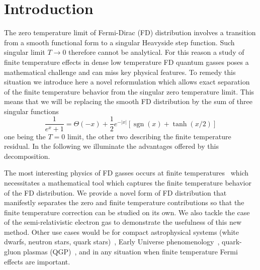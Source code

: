 \documentclass[sn-mathphys,Numbered]{sn-jnl}
\DeclareMathOperator{\sgn}{sgn}
\begin{document}

\maketitle

\section{Introduction}
\label{sec1}



The  zero temperature limit of Fermi-Dirac (FD) distribution involves a transition from a smooth functional form to a singular Heavyside step function. Such singular limit  $
T\to 0$ therefore cannot be analytical.  For this reason a study of finite temperature effects in dense  low temperature  FD quantum gasses poses a mathematical challenge and can miss key physical features.  To remedy this situation we introduce here a novel reformulation which allows exact separation of the finite temperature behavior from the singular zero temperature limit. This means that we will be replacing the smooth FD distribution by the sum of three singular functions
$$
\boxed{\frac{1}{e^{x} +1}=\Theta(-x)+\frac{1}{2}e^{-|x|}\left[\sgn(x)+\tanh(x/2)\right]}
$$
one being the $T=0$ limit,  the other two describing the finite temperature residual. In the following we illuminate the advantages offered by this decomposition.  


The most interesting physics of FD gasses occurs at finite temperatures~\cite{Elze:1980er} which necessitates a mathematical tool which captures the finite temperature behavior of the FD distribution. We provide a novel form of FD distribution that manifestly separates the zero and finite temperature contributions so that the finite temperature correction can be studied on its own. We also tackle the case of the semi-relativistic electron gas to demonstrate the usefulness of this new method. Other use cases would be for compact astrophysical systems (white dwarfs, neutron stars, quark stars)~\cite{Kaspi:2017fwg,Ferrer:2019xlr,Ferrer:2023pgq}, Early Universe phenomenology~\cite{Rafelski:2021aey,Rafelski:2023emw,Grayson:2023flr,Steinmetz:2023nsc}, quark-gluon plasmas (QGP)~\cite{Letessier:2002ony,Rafelski:2020ajx,Yang:2021bko}, and in any situation when finite temperature Fermi effects are important.
\end{document}
